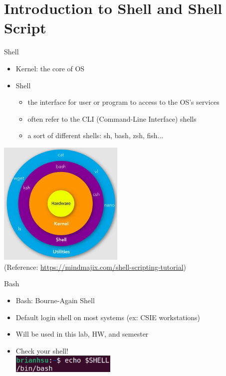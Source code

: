 \section{Introduction to Shell and Shell Script}

\begin{frame}{Shell}
\begin{multicols}{2}
\begin{itemize}
\item Kernel: the core of OS
\item Shell
\begin{itemize}
\item the interface for user or program to access to the OS's services
\item often refer to the CLI (Command-Line Interface) shells
\item a sort of different shells: sh, bash, zsh, fish...
\end{itemize}
\end{itemize}
\newpage
\includegraphics[width=6cm]{shell.png}\\
\tiny{(Reference: \url{https://mindmajix.com/shell-scripting-tutorial})}
\end{multicols}
\end{frame}

\begin{frame}{Bash}
\begin{itemize}
\item Bash: Bourne-Again Shell
\item Default login shell on most systems (ex: CSIE workstations)
\item Will be used in this lab, HW, and semester
\item Check your shell!\\
\includegraphics[width=5cm]{echoshell.png}
\end{itemize}
\end{frame}

